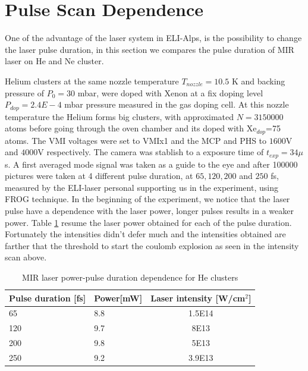 \section{Pulse Scan Dependence}

One of the advantage of the laser system in ELI-Alps, is the possibility to change the laser pulse duration, in this section  we compares the pulse duration of MIR laser on He and Ne cluster. 

Helium clusters at the same nozzle temperature $T_{nozzle}=10.5$ K and  backing pressure of $P_{0}=30$ mbar, were doped with Xenon at a fix doping level $P_{dop}=2.4E-4$ mbar pressure measured in the gas doping cell. At this nozzle temperature the Helium forms big clusters, with approximated $N=3150000$ atoms before going through the oven chamber and its doped with Xe$_{dop}$=75 atoms. The VMI voltages were set to VMIx1 and the MCP and PHS to $1600$V and $4000$V respectively. The camera was stablish to a exposure time of $t_{exp}=34 \mu$s. A first averaged mode signal was taken as a guide to the eye and after 100000 pictures were taken at 4 different pulse duration, at $65, 120, 200$ and $250$  fs, measured by the ELI-laser personal supporting us in the experiment, using FROG technique.
In the beginning of the experiment, we notice that the laser pulse have a dependence with the laser power, longer pulses results in a weaker power. Table \ref{tab:pulsepower} resume the laser power obtained for each of the pulse duration. Fortunately the intensities didn't defer much and the intensities obtained are farther that the threshold to start the coulomb explosion as seen in the intensity scan above.
  
   
\begin{table}[]
\centering
\label{tab:pulsepower}
\begin{tabular}{|l|l|c|}
\hline
Pulse duration {[}fs{]} & \multicolumn{1}{c|}{Power{[}mW{]}} & Laser intensity {[}W/cm$^{2}${]} \\ \hline
65 & 8.8 & 1.5E14 \\ \hline
120 & 9.7 & 8E13 \\ \hline
200 & 9.8 & 5E13 \\ \hline
250 & 9.2 & 3.9E13 \\ \hline
\end{tabular}
\caption{MIR laser power-pulse duration dependence for He clusters}
\end{table}

